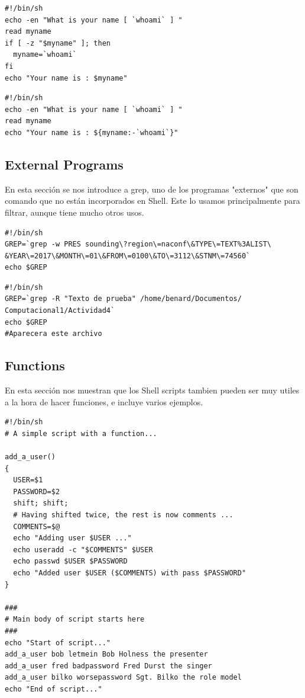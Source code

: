 \documentclass{article}
\begin{document}
\begin{verbatim}
#!/bin/sh
echo -en "What is your name [ `whoami` ] "
read myname
if [ -z "$myname" ]; then
  myname=`whoami`
fi
echo "Your name is : $myname"
\end{verbatim}

\begin{verbatim}
#!/bin/sh
echo -en "What is your name [ `whoami` ] "
read myname
echo "Your name is : ${myname:-`whoami`}"
\end{verbatim}

\subsection{External Programs}
En esta sección se nos introduce a grep, uno de los programas "externos" que son comando que no están incorporados en Shell. Este lo usamos principalmente para filtrar, aunque tiene mucho otros usos.

\begin{verbatim}
#!/bin/sh
GREP=`grep -w PRES sounding\?region\=naconf\&TYPE\=TEXT%3ALIST\
&YEAR\=2017\&MONTH\=01\&FROM\=0100\&TO\=3112\&STNM\=74560`
echo $GREP
\end{verbatim}

\begin{verbatim}
#!/bin/sh
GREP=`grep -R "Texto de prueba" /home/benard/Documentos/
Computacional1/Actividad4`
echo $GREP
#Aparecera este archivo
\end{verbatim}

\subsection{Functions}
En esta sección nos muestran que los Shell scripts tambien pueden ser muy utiles a la hora de hacer funciones, e incluye varios ejemplos.

\begin{verbatim}
#!/bin/sh
# A simple script with a function...

add_a_user()
{
  USER=$1
  PASSWORD=$2
  shift; shift;
  # Having shifted twice, the rest is now comments ...
  COMMENTS=$@
  echo "Adding user $USER ..."
  echo useradd -c "$COMMENTS" $USER
  echo passwd $USER $PASSWORD
  echo "Added user $USER ($COMMENTS) with pass $PASSWORD"
}

###
# Main body of script starts here
###
echo "Start of script..."
add_a_user bob letmein Bob Holness the presenter
add_a_user fred badpassword Fred Durst the singer
add_a_user bilko worsepassword Sgt. Bilko the role model
echo "End of script..."
\end{verbatim}
\end{document}
